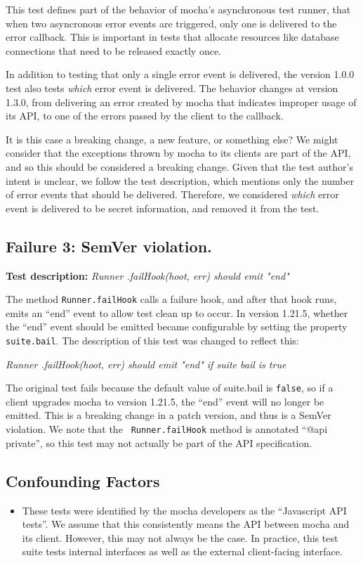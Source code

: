 This test defines part of the behavior of mocha's asynchronous test
runner, that when two asyncronous error events are triggered, only one
is delivered to the error callback. This is important in tests that
allocate resources like database connections that need to be released
exactly once.

In addition to testing that only a single error event is delivered,
the version 1.0.0 test also tests {\em which} error event is
delivered. The behavior changes at version 1.3.0, from delivering an
error created by mocha that indicates improper usage of its API, to
one of the errors passed by the client to the callback.  

It is this case a breaking change, a new feature, or something else?
We might consider that the exceptions thrown by mocha to its clients
are part of the API, and so this should be considered a breaking
change.  Given that the test author's intent is unclear, we follow the
test description, which mentions only the number of error events that
should be delivered. Therefore, we considered {\em which} error event
is delivered to be secret information, and removed it from the test.

\subsection{Failure 3: SemVer violation.}

{\bf Test description:}
%
{\em Runner .failHook(hoot, err) should emit "end" }

The method {\tt Runner.failHook} calls a failure hook, and after that
hook runs, emits an ``end'' event to allow test clean up to occur. In
version 1.21.5, whether the ``end'' event should be emitted became
configurable by setting the property {\tt suite.bail}.  The
description of this test was changed to reflect this:

{\em Runner .failHook(hoot, err) should emit "end" if suite bail is
  true }

The original test fails because the default value of suite.bail is
{\tt false}, so if a client upgrades mocha to version 1.21.5, the
``end'' event will no longer be emitted. This is a breaking change in
a patch version, and thus is a SemVer violation. We note that the {\tt
  Runner.failHook} method is annotated ``@api private'', so this test
may not actually be part of the API specification.

\subsection{Confounding Factors}
\begin{itemize}
\item These tests were identified by the mocha developers as the
  ``Javascript API tests''. We assume that this consistently means the
  API between mocha and its client. However, this may not always be
  the case. In practice, this test suite tests internal interfaces as
  well as the external client-facing interface. 
\end{itemize}